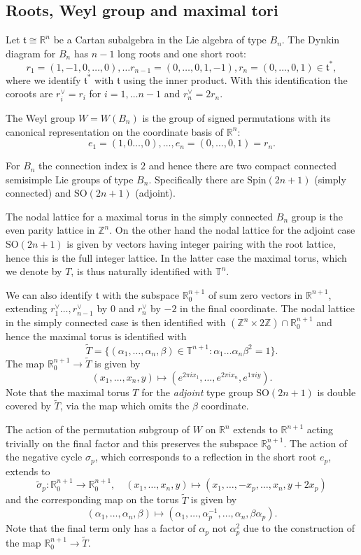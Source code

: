 \documentclass[11pt,a4paper]{article}
\def\Spin{\mathrm{Spin}}
\def\SO{\mathrm{SO}}
\def\t{\mathfrak t}
\def\R{\mathbb{R}}
\def\Z{\mathbb{Z}}
\def\TT{\mathbb{T}}
\def\coveringtorus{\tilde{T}}
\begin{document}
\subsection{Roots, Weyl group and maximal tori}

Let $\t\cong \R^n$ be a Cartan subalgebra in the Lie algebra of type $B_n$. The Dynkin diagram for $B_n$ has $n-1$ long roots and one short root:
\[
r_1=(1,-1,0,\dots,0),\dots r_{n-1}=(0,\dots,0,1,-1), r_n=(0,\dots ,0,1)\in \t^*,
\]
where we identify $\t^*$ with $\t$ using the inner product.  With this identification the coroots are $r_i^\vee = r_i$ for $i=1,\dots n-1$ and $r_n^\vee=2r_n$.

The Weyl group $W=W(B_n)$ is the group of signed permutations with its canonical representation on the coordinate basis of $\R^n$:
\[
e_1=(1,0\dots,0),\dots,e_n=(0,\dots,0,1)=r_n.
\]

\bigskip

For $B_n$ the connection index is $2$ and hence there are two compact connected semisimple Lie groups of type $B_n$.  Specifically there are $\Spin(2n+1)$ (simply connected) and $\SO(2n+1)$ (adjoint).

The nodal lattice for a maximal torus in the simply connected $B_n$ group is the even parity lattice in $\Z^n$.  On the other hand the nodal lattice for the adjoint case $\SO(2n+1)$ is given by vectors having integer pairing with the root lattice, hence this is the full integer lattice. In the latter case the maximal torus, which we denote by $T$, is thus naturally identified with $\TT^n$.


We can also identify $\t$ with the subspace $\R^{n+1}_0$ of sum zero vectors in $\R^{n+1}$, extending $r_1^\vee\dots,r_{n-1}^\vee$ by $0$ and $r_n^\vee$ by $-2$ in the final coordinate. The nodal lattice in the simply connected case is then identified with $(\Z^n\times 2\Z)\cap \R^{n+1}_0$ and hence the maximal torus is identified with
\[
\coveringtorus=\{(\alpha_1,\dots,\alpha_n,\beta)\in \TT^{n+1} : \alpha_1\dots\alpha_n\beta^2=1\}.
\]
The map $\R^{n+1}_0\to \coveringtorus$ is given by
\[
(x_1,\dots,x_n,y)\mapsto (e^{2\pi i x_1},\dots,e^{2\pi ix_n},e^{1\pi iy}).
\]
Note that the maximal torus $T$ for the \emph{adjoint} type group $\SO(2n+1)$ is double covered by $\coveringtorus$, via the map which omits the $\beta$ coordinate.

\bigskip


The action of the permutation subgroup of $W$ on $\R^n$ extends to $\R^{n+1}$ acting trivially on the final factor and this preserves the subspace $\R^{n+1}_0$. The action of the negative cycle $\sigma_p$, which corresponds to a reflection in the short root $e_p$, extends to
\[
\tilde{\sigma}_p:\R^{n+1}_0\to \R^{n+1}_0,\quad (x_1,\dots,x_n,y) \mapsto (x_1,\dots, -x_p,\dots,x_n,y+2x_p)
\]
and the corresponding map on the torus $\coveringtorus$ is given by 
\[
(\alpha_1,\dots,\alpha_n,\beta)\mapsto (\alpha_1,\dots,\alpha_p^{-1},\dots,\alpha_n,\beta\alpha_p).
\]
Note that the final term only has a factor of $\alpha_p$ not $\alpha_p^2$ due to the construction of the map $\R^{n+1}_0\to \coveringtorus$.
\end{document}
